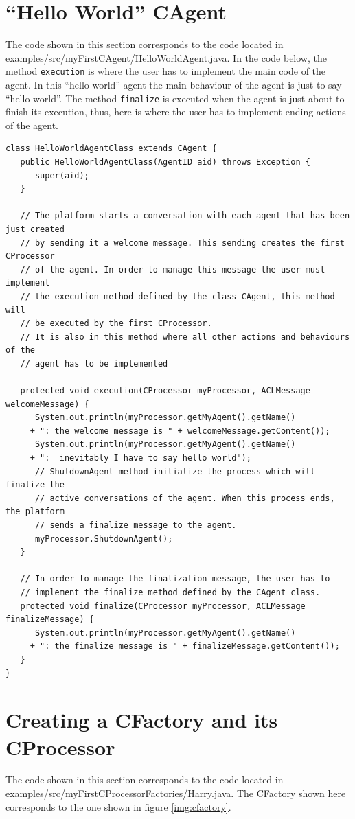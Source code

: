 \section{``Hello World'' CAgent}
The code shown in this section corresponds to the code located in examples/src/myFirstCAgent/HelloWorldAgent.java. In the code below, the method \texttt{execution} is where the user has to implement the main code of the agent. In this ``hello world'' agent the main behaviour of the agent is just to say ``hello world''. The method \texttt{finalize} is executed when the agent is just about to finish its execution, thus, here is where the user has to implement ending actions of the agent.
\begin{lstlisting}[style=Java]
class HelloWorldAgentClass extends CAgent {
   public HelloWorldAgentClass(AgentID aid) throws Exception {
      super(aid);
   }

   // The platform starts a conversation with each agent that has been just created
   // by sending it a welcome message. This sending creates the first CProcessor
   // of the agent. In order to manage this message the user must implement
   // the execution method defined by the class CAgent, this method will
   // be executed by the first CProcessor.
   // It is also in this method where all other actions and behaviours of the
   // agent has to be implemented

   protected void execution(CProcessor myProcessor, ACLMessage welcomeMessage) {
      System.out.println(myProcessor.getMyAgent().getName()
	 + ": the welcome message is " + welcomeMessage.getContent());
      System.out.println(myProcessor.getMyAgent().getName()
	 + ":  inevitably I have to say hello world");
      // ShutdownAgent method initialize the process which will finalize the
      // active conversations of the agent. When this process ends, the platform
      // sends a finalize message to the agent.
      myProcessor.ShutdownAgent();
   }

   // In order to manage the finalization message, the user has to
   // implement the finalize method defined by the CAgent class.
   protected void finalize(CProcessor myProcessor, ACLMessage finalizeMessage) {
      System.out.println(myProcessor.getMyAgent().getName()
	 + ": the finalize message is " + finalizeMessage.getContent());
   }
}
\end{lstlisting}

\section{Creating a CFactory and its CProcessor}
\label{subsec:cprocessor}
The code shown in this section corresponds to the code located in examples/src/myFirstCProcessorFactories/Harry.java. The CFactory shown here corresponds to the one shown in figure \ref{img:cfactory}.

